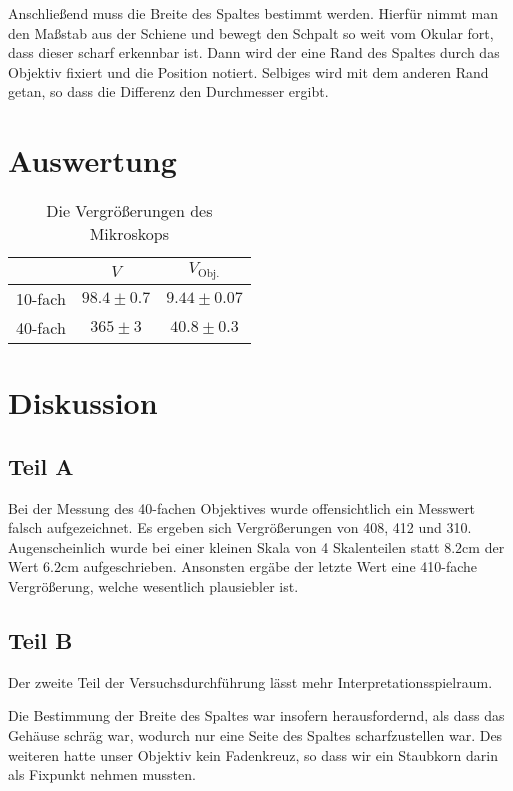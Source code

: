 \documentclass[12pt,a4paper,titlepage,headinclude,bibtotoc]{scrartcl}
\begin{document}
Anschließend muss die Breite des Spaltes bestimmt werden.
Hierfür nimmt man den Maßstab aus der Schiene und bewegt den Schpalt so weit vom Okular fort, dass dieser scharf erkennbar ist.
Dann wird der eine Rand des Spaltes  durch das Objektiv fixiert und die Position notiert.
Selbiges wird mit dem anderen Rand getan, so dass die Differenz den Durchmesser ergibt.



\section{Auswertung}
\label{sec:auswertung}

\begin{table}
\centering
\begin{tabular}{|c||c|c|}
\hline
 & $V$ & $V_\text{Obj.}$\\\hline\hline
10-fach & $98.4\pm0.7$ & $9.44\pm0.07$\\\hline
40-fach & $365\pm 3$ & $40.8\pm 0.3$\\\hline
\end{tabular}
\caption{Die Vergrößerungen des Mikroskops}
\label{tab:vergr}
\end{table}

\section{Diskussion}
\label{sec:diskussion}
\subsection{Teil A}
Bei der Messung des 40-fachen Objektives wurde offensichtlich ein Messwert falsch aufgezeichnet.
Es ergeben sich Vergrößerungen von 408, 412 und 310.
Augenscheinlich wurde bei einer kleinen Skala von 4 Skalenteilen statt $8.2\si{\centi\metre}$ der Wert $6.2\si{\centi\metre}$ aufgeschrieben.
Ansonsten ergäbe der letzte Wert eine 410-fache Vergrößerung, welche wesentlich plausiebler ist.

\subsection{Teil B}
Der zweite Teil der Versuchsdurchführung lässt mehr Interpretationsspielraum.

Die Bestimmung der Breite des Spaltes war insofern herausfordernd, als dass das Gehäuse schräg war, wodurch nur eine Seite des Spaltes scharfzustellen war.
Des weiteren hatte unser Objektiv kein Fadenkreuz, so dass wir ein Staubkorn darin als Fixpunkt nehmen mussten.




\end{document}
